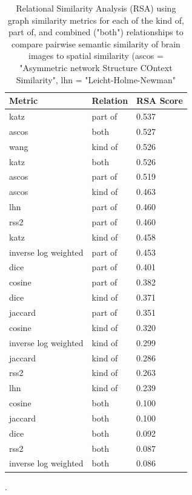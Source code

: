 \documentclass{report}
\begin{document}
\begin{table}[h!]
\centering
\begin{tabular}{ | l | l | l |}
    \hline
    \textbf{Metric} & \textbf{Relation} & \textbf{RSA Score} \\ \hline
    katz  & part of & 0.537 \\ \hline
    ascos &  both & 0.527 \\ \hline
    wang &  kind of &  0.526 \\ \hline
    katz &  both &  0.526 \\ \hline
    ascos & part of	& 0.519 \\ \hline
    ascos & kind of	& 0.463 \\ \hline
    lhn & part of & 0.460 \\ \hline
    rss2 & part of & 0.460 \\ \hline
    katz & kind of &  0.458 \\ \hline
    inverse log weighted & part of	&  0.453 \\ \hline
    dice & part of & 0.401 \\ \hline
    cosine & part of & 0.382 \\ \hline
    dice & kind of & 0.371 \\ \hline
    jaccard & part of & 0.351 \\ \hline
    cosine & kind of & 0.320 \\ \hline
    inverse log weighted & kind of & 0.299 \\ \hline
    jaccard	& kind of & 0.286 \\ \hline
    rss2 & kind of & 0.263 \\ \hline
    lhn & kind of & 0.239 \\ \hline
    cosine & both & 0.100 \\ \hline
    jaccard	& both & 0.100 \\ \hline
    dice & both & 0.092 \\ \hline
    rss2 & both & 0.087 \\ \hline
    inverse log weighted & both & 0.086 \\ \hline
\end {tabular}\par
\bigskip
\caption{\label{table:table31} Relational Similarity Analysis (RSA) using graph similarity metrics for each of the kind of, part of, and combined ("both") relationships to compare pairwise semantic similarity of brain images to spatial similarity (ascos = "Asymmetric network Structure COntext Similarity", lhn = "Leicht-Holme-Newman"}.
\end{table}
\end{document}
